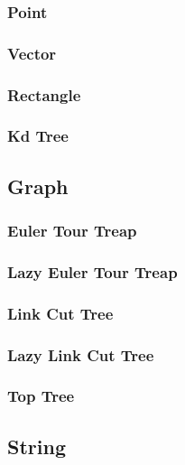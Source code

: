 \documentclass[8pt]{article}
\begin{document}
\subsubsection{Point}

\subsubsection{Vector}

\subsubsection{Rectangle}

\subsubsection{Kd Tree}


\subsection{Graph}
\subsubsection{Euler Tour Treap}

\subsubsection{Lazy Euler Tour Treap}

\subsubsection{Link Cut Tree}

\subsubsection{Lazy Link Cut Tree}

\subsubsection{Top Tree}


\subsection{String}
\end{document}
